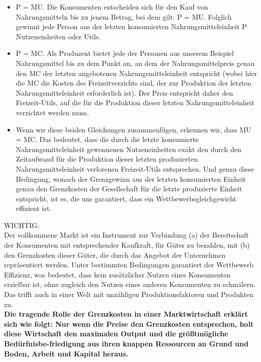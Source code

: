 \documentclass[10pt]{scrartcl}
\begin{document}
\begin{itemize}
\item P = MU. Die Konsumenten entscheiden sich für den Kauf von Nahrungsmitteln bis zu jenem Betrag, bei dem gilt: P = MU. Folglich gewinnt jede Person aus der letzten konsumierten Nahrungsmitteleinheit P Nutzeneinheiten oder Utils.
\item P = MC. Als Produzent bietet jede der Personen aus unserem Beispiel Nahrungsmittel bis zu dem Punkt an, an dem der Nahrungsmittelpreis genau den MC der letzten angebotenen Nahrungsmitteleinheit entspricht (wobei hier die MC die Kosten des Freizeitverzichts sind, der zur Produktion der letzten Nahrungsmitteleinheit erforderlich ist). Der Preis entspricht daher den Freizeit-Utils, auf die für die Produktion dieser letzten Nahrungsmitteleinheit verzichtet werden muss.
\item Wenn wir diese beiden Gleichungen zusammenfügen, erkennen wir, dass MU = MC.
Das bedeutet, dass die durch die letzte konsumierte Nahrungsmitteleinheit gewonnenen Nutzeneinheiten exakt den durch den Zeitaufwand für die Produktion dieser letzten produzierten Nahrungsmitteleinheit verlorenen Freizeit-Utils entsprechen. Und genau diese Bedingung, wonach der Grenzgewinn aus der letzten konsumierten Einheit genau den Grenzkosten der Gesellschaft für die letzte produzierte Einheit entspricht, ist es, die uns garantiert, dass ein Wettbewerbsgleichgewicht effizient ist.
\end{itemize}
WICHTIG:\\
Der vollkommene Markt ist ein Instrument zur Verbindung (a) der Bereitschaft der Konsumenten mit entsprechender Kaufkraft, für Güter zu bezahlen, mit (b) den Grenzkosten dieser Güter, die durch das Angebot der Unternehmen repräsentiert werden. Unter bestimmten Bedingungen garantiert der Wettbewerb Effizienz, was bedeutet, dass kein zusätzlicher Nutzen eines Konsumenten erzielbar ist, ohne zugleich den Nutzen eines anderen Konsumenten zu schmälern. Das trifft auch in einer Welt mit unzähligen Produktionsfaktoren und Produkten zu.\\
{\bf Die tragende Rolle der Grenzkosten in einer Marktwirtschaft erklärt sich wie folgt: Nur wenn die Preise den Grenzkosten entsprechen, holt diese Wirtschaft den maximalen Output und die größtmögliche Bedürfnisbe-friedigung aus ihren knappen Ressourcen an Grund und Boden, Arbeit und Kapital heraus. } 
\end{document}
